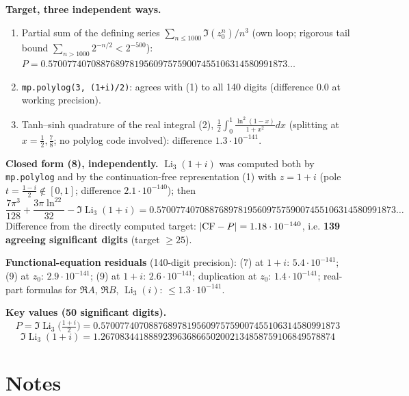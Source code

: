 \documentclass[11pt]{article}
\theoremstyle{remark}
\begin{document}
\textbf{Target, three independent ways.}
\begin{enumerate}
\item Partial sum of the defining series $\sum_{n\le1000}\Im(z_0^n)/n^3$ (own loop; rigorous tail bound $\sum_{n>1000}2^{-n/2}<2^{-500}$):
   $P=0.57007740708876897819560975759007455106314580991873\ldots$
\item \texttt{mp.polylog(3, (1+i)/2)}: agrees with (1) to all 140 digits (difference $0.0$ at working precision).
\item Tanh--sinh quadrature of the real integral (2), $\tfrac12\int_0^1\frac{\ln^2(1-x)}{1+x^2}dx$ (splitting at $x=\tfrac12,\tfrac78$; no polylog code involved): difference $1.3\cdot10^{-141}$.
\end{enumerate}

\textbf{Closed form (8), independently.} $\operatorname{Li}_3(1+i)$ was computed both by \texttt{mp.polylog} and by the continuation-free representation (1) with $z=1+i$ (pole $t=\tfrac{1-i}2\notin[0,1]$; difference $2.1\cdot10^{-140}$); then
\[
\frac{7\pi^3}{128}+\frac{3\pi\ln^22}{32}-\Im\operatorname{Li}_3(1+i)=0.57007740708876897819560975759007455106314580991873\ldots
\]
Difference from the directly computed target: $|{\rm CF}-P|=1.18\cdot10^{-140}$, i.e. \textbf{139 agreeing significant digits} (target $\ge25$).

\textbf{Functional-equation residuals} (140-digit precision): (7) at $1+i$: $5.4\cdot10^{-141}$; (9) at $z_0$: $2.9\cdot10^{-141}$; (9) at $1+i$: $2.6\cdot10^{-141}$; duplication at $z_0$: $1.4\cdot10^{-141}$; real-part formulas for $\Re A$, $\Re B$, $\operatorname{Li}_3(i)$: $\le1.3\cdot10^{-141}$.

\textbf{Key values (50 significant digits).}
\[
P=\Im\operatorname{Li}_3\!\big(\tfrac{1+i}2\big)=0.57007740708876897819560975759007455106314580991873
\]
\[
\Im\operatorname{Li}_3(1+i)=1.2670834418889239636866502002134858759106849578874
\]

\section*{Notes}
\end{document}
